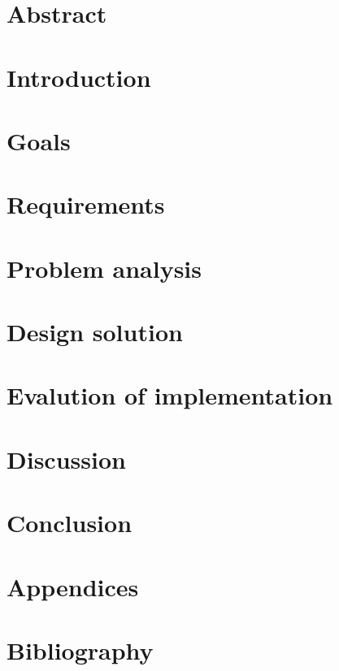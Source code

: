 \documentclass{article}
\begin{document}

\clearpage

\section*{Abstract}

\clearpage

\tableofcontents
\clearpage

\section{Introduction}

\clearpage

\section{Goals}

\clearpage

\section{Requirements}

\clearpage

\section{Problem analysis}

\clearpage

\section{Design solution}

\clearpage


\clearpage

\section{Evalution of implementation}

\clearpage

\section{Discussion}

\clearpage

\section{Conclusion}

\clearpage

\section{Appendices}

\clearpage

\section{Bibliography}

\clearpage
\end{document}
